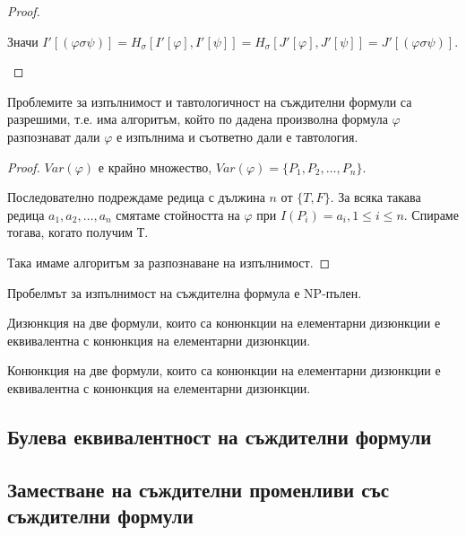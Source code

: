 \documentclass{article}
\def\Proofs{1}
\begin{document}
\begin{claim}
\begin{proof}
\begin{itemize}
Значи $I'[(\varphi \sigma \psi)] = H_{\sigma}[I'[\varphi], I'[\psi]] = H_{\sigma}[J'[\varphi], J'[\psi]] = J'[(\varphi \sigma \psi)]$.

\end{itemize}
\end{proof}
\fi

\begin{conseq}
Проблемите за изпълнимост и тавтологичност на съждителни формули са разрешими, т.е. има алгоритъм, който по дадена произволна формула $\varphi$ разпознават дали $\varphi$ е изпълнима и съответно дали е тавтология.


\ifcase\Proofs\or
\begin{proof}
$Var(\varphi)$ е крайно множество, $Var(\varphi) = \{P_1, P_2, \ldots, P_n\}$.

Последователно подреждаме редица с дължина $n$ от $\{T, F\}$. За всяка такава редица $a_1, a_2, \ldots, a_n$ смятаме стойността на $\varphi$ при $I(P_i) = a_i, 1 \leq i \leq n$. Спираме тогава, когато получим $Т$.

Така имаме алгоритъм за разпознаване на изпълнимост.
\end{proof}
\fi
\end{conseq}

\begin{remark}
Пробелмът за изпълнимост на съждителна формула е NP-пълен.
\end{remark}
\end{claim}


\begin{claim}
Дизюнкция на две формули, които са конюнкции на елементарни дизюнкции е еквивалентна с конюнкция на елементарни дизюнкции.
\end{claim}

\begin{claim}
Конюнкция на две формули, които са конюнкции на елементарни дизюнкции е еквивалентна с конюнкция на елементарни дизюнкции.
\end{claim}

\subsection*{Булева еквивалентност на съждителни формули}


\subsection*{Заместване на съждителни променливи със съждителни формули}
\end{document}
